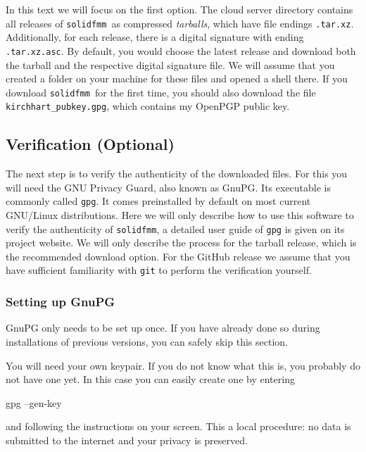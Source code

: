\documentclass{scrbook}
\newcommand{\solidfmm}{\texttt{solidfmm}}
\begin{document}
In this text we will focus on the first option. The cloud server directory
contains all releases of \solidfmm\ as compressed \emph{tarballs}, which have
file endings \lstinline|.tar.xz|. Additionally, for each release, there is a
digital signature with ending \lstinline|.tar.xz.asc|. By default, you would
choose the latest release and download both the tarball and the respective
digital signature file. We will assume that you created a folder on your machine
for these files and opened a shell there. If you download \solidfmm\ for the
first time, you should also download the file 
\lstinline|kirchhart_pubkey.gpg|, which contains my OpenPGP public key.

\subsection{Verification (Optional)}
The next step is to verify the authenticity of the downloaded files. For this
you will need the GNU Privacy Guard, also known as GnuPG.\autocite{gnupg} Its
executable is commonly called \lstinline|gpg|. It comes preinstalled by default
on most current GNU/Linux distributions. Here we will only describe how to use
this software to verify the authenticity of \solidfmm, a detailed user guide
of \lstinline|gpg| is given on its project website. We will only describe the
process for the tarball release, which is the recommended download option.
For the GitHub release we assume that you have sufficient familiarity with
\lstinline|git| to perform the verification yourself.


\subsubsection{Setting up GnuPG}
GnuPG only needs to be set up once. If you have already done so during
installations of previous versions, you can safely skip this section.

You will need your own keypair. If you do not know what this is, you probably
do not have one yet. In this case you can easily create one by entering
\begin{commandshell*}
gpg --gen-key
\end{commandshell*}
and following the instructions on your screen. This a local procedure: no data
is submitted to the internet and your privacy is preserved.
\end{document}
